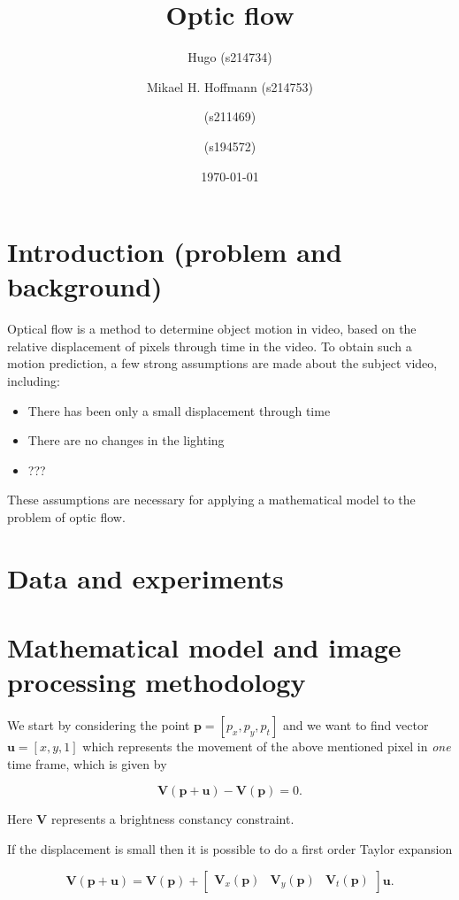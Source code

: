 \documentclass{article}
\title{Optic flow}
\author{Hugo (s214734) \and Mikael H. Hoffmann (s214753) \and (s211469) \and (s194572)}
\date{\today}
\begin{document}
\maketitle

\section{Introduction (problem and background)}
Optical flow is a method to determine object motion in video, based on the relative displacement of pixels
through time in the video. To obtain such a motion prediction, a few strong assumptions are made
about the subject video, including:
\begin{itemize}
    \item There has been only a small displacement through time
    \item There are no changes in the lighting
    \item ???
\end{itemize}
These assumptions are necessary for applying a mathematical model to the problem of optic flow.


\section{Data and experiments}

\section{Mathematical model and image processing methodology}
We start by considering the point $\boldsymbol{p} = [p_x, p_y, p_t]$ and we want to find vector $\boldsymbol{u} = [x, y, 1]$ which represents the movement of the above mentioned pixel in \emph{one} time frame, which is given by

\begin{equation}\label{eq:initial-equation}
    \boldsymbol{V(p + u)} - \boldsymbol{V(p)} = 0.
\end{equation}

Here $\boldsymbol{V}$ represents a brightness constancy constraint. 

If the displacement is small then it is possible to do a first order Taylor expansion

\begin{equation}
    \boldsymbol{V(p + u)} = \boldsymbol{V(p)} + \begin{bmatrix}
        \boldsymbol{V}_x(\boldsymbol{p}) & \boldsymbol{V}_y(\boldsymbol{p}) & \boldsymbol{V}_t(\boldsymbol{p})
    \end{bmatrix} \boldsymbol{u}.
\end{equation}
\end{document}
